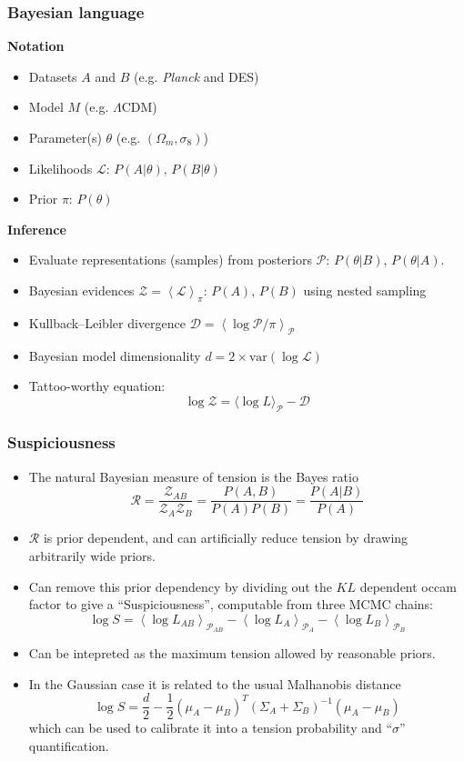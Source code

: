 \documentclass[aspectratio=169]{beamer}
\newcommand{\mean}[2][]{\left\langle#2\right\rangle_{#1}}
\begin{document}
\begin{frame}
    \frametitle{Bayesian language}
    \textbf{Notation}
    \begin{itemize}
        \item Datasets $A$ and $B$ (e.g. \textit{Planck} and DES)
        \item Model $M$ (e.g. $\Lambda$CDM)
        \item Parameter(s) $\theta$ (e.g. $(\Omega_m,\sigma_8)$) 
        \item Likelihoods $\mathcal{L}$: $P(A|\theta)$, $P(B|\theta)$ 
        \item Prior $\pi$: $P(\theta)$
    \end{itemize}
    \textbf{Inference}
    \begin{itemize}
        \item Evaluate representations (samples) from posteriors $\mathcal{P}$: $P(\theta|B)$, $P(\theta|A)$.
        \item Bayesian evidences $\mathcal{Z}=\mean[\pi]{\mathcal{L}}$: $P(A)$, $P(B)$ using nested sampling
        \item Kullback--Leibler divergence $\mathcal{D}=\mean[\mathcal{P}]{\log\mathcal{P}/\pi}$
        \item Bayesian model dimensionality $d = 2\times\mathrm{var}(\log\mathcal{L})$  
        \item Tattoo-worthy equation:
        \[ \log\mathcal{Z} = \langle\log L\rangle_\mathcal{P} - \mathcal{D}  \]
    \end{itemize}

\end{frame}
\begin{frame}
    \frametitle{Suspiciousness }

    \begin{itemize}
        \item The natural Bayesian measure of tension is the Bayes ratio
            \[ \mathcal{R} = \frac{\mathcal{Z}_{AB}}{\mathcal{Z}_A\mathcal{Z}_B} = \frac{P(A,B)}{P(A)P(B)} = \frac{P(A|B)}{P(A)} \]
        \item $\mathcal{R}$ is prior dependent, and can artificially reduce tension by drawing arbitrarily wide priors.
        \item Can remove this prior dependency by dividing out the $KL$ dependent occam factor to give a ``Suspiciousness'', computable from three MCMC chains:
            \[
                \log S = \mean[\mathcal{P}_{AB}]{\log L_{AB}} - \mean[\mathcal{P}_{A}]{\log L_{A}}- \mean[\mathcal{P}_{B}]{\log L_{B}}
            \]
        \item Can be intepreted as the maximum tension allowed by reasonable priors.
        \item In the Gaussian case it is related to the usual Malhanobis distance 
            \[\log S = \frac{d}{2} - \frac{1}{2}(\mu_A-\mu_B)^T(\Sigma_A+\Sigma_B)^{-1}(\mu_A-\mu_B) \]
            which can be used to calibrate it into a tension probability and ``$\sigma$'' quantification.
    \end{itemize}
\end{frame}
\end{document}
